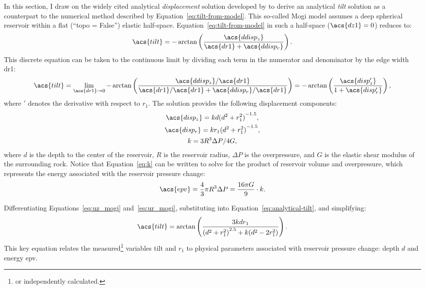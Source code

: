 In this section, I draw on the widely cited analytical \emph{displacement} solution developed by \textcite{mogi_relations_1958} to derive an analytical \emph{tilt} solution as a counterpart to the numerical method described by Equation~\eqref{eq:tilt-from-model}. This so-called Mogi model assumes a deep spherical reservoir within a flat (``topo = False'') elastic half-space. Equation~\eqref{eq:tilt-from-model} in such a half-space ($\acs{dz1} = 0$) reduces to:
\begin{equation}
    \acs{tilt} = 
    -\arctan\left(\dfrac{\acs{ddisp_z}}{\acs{dr1}+\acs{ddisp_r}}\right).\label{eq:tilt-from-flat-model}
\end{equation}
This discrete equation can be taken to the continuous limit by dividing each term in the numerator and denominator by the edge width \acs{dr1}:
\begin{equation}
\acs{tilt}
    = \lim_{\acs{dr1}\to0} 
    -\arctan\left(\dfrac{\acs{ddisp_z}/\acs{dr1}}{\acs{dr1}/\acs{dr1}
    + \acs{ddisp_r}/\acs{dr1}}\right) = 
    -\arctan\left(\dfrac{\acs{disp_z'}}{1+\acs{disp_r'}}\right),\label{eq:analytical-tilt}
\end{equation}
where $'$ denotes the derivative with respect to $r_1$. The \textcite{mogi_relations_1958} solution provides the following displacement components:
\begin{gather}
    \acs{disp_z} = kd{(d^2+r_1^2)}^{-1.5},\label{eq:uz_mogi}\\
    \acs{disp_r} = kr_1{(d^2+r_1^2)}^{-1.5},\label{eq:ur_mogi}\\
    k = {3R^3\Delta P}/{4G},\label{eq:k}
\end{gather}
where $d$ is the depth to the center of the reservoir, $R$ is the reservoir radius, $\Delta P$ is the overpressure, and $G$ is the elastic shear modulus of the surrounding rock. Notice that Equation~\eqref{eq:k} can be written to solve for the product of reservoir volume and overpressure, which represents the energy associated with the reservoir pressure change:
\begin{equation}
    \acs{epv} = \frac{4}{3}\pi R^3\Delta P=\frac{16\pi G}{9} \cdot k.\label{eq:epv}
\end{equation}

Differentiating Equations~\eqref{eq:uz_mogi} and~\eqref{eq:ur_mogi}, substituting into Equation~\eqref{eq:analytical-tilt}, and simplifying:
\begin{equation}
    \acs{tilt} = \arctan\left(\frac{3kdr_1}{{(d^2+r_1^2)}^{2.5}+k(d^2-2r_1^2)}\right).\label{eq:mogi-tilt}
\end{equation}
This key equation relates the measured\footnote{or independently calculated.} variables \acs{tilt} and $r_1$ to physical parameters associated with reservoir pressure change: depth $d$ and energy \acs{epv}.

